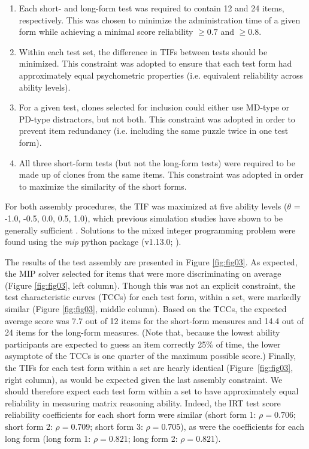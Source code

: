 \documentclass[a4paper,man,natbib,noextraspace]{apa6}
\begin{document}
\begin{enumerate}

    \item Each short- and long-form test was required to contain 12 and 24 items, respectively. This was chosen to minimize the administration time of a given form while achieving a minimal score reliability $\geq 0.7$ and $\geq 0.8$.
        
    \item Within each test set, the difference in TIFs between tests should be minimized. This constraint was adopted to ensure that each test form had approximately equal psychometric properties (i.e. equivalent reliability across ability levels). 
        
    \item For a given test, clones selected for inclusion could either use MD-type or PD-type distractors, but not both. This constraint was adopted in order to prevent item redundancy (i.e. including the same puzzle twice in one test form).
        
    \item All three short-form tests (but not the long-form tests) were required to be made up of clones from the same items. This constraint was adopted in order to maximize the similarity of the short forms.
    
\end{enumerate}

\noindent For both assembly procedures, the TIF was maximized at five ability levels ($\theta$ = -1.0, -0.5, 0.0, 0.5, 1.0), which previous simulation studies have shown to be generally sufficient \citep{der2005wj}. Solutions to the mixed integer programming problem were found using the \textit{mip} python package (v1.13.0; \citealt{santos2020mixed}).

The results of the test assembly are presented in Figure \ref{fig:fig03}. As expected, the MIP solver selected for items that were more discriminating on average (Figure \ref{fig:fig03}, left column). Though this was not an explicit constraint, the test characteristic curves (TCCs) for each test form, within a set, were markedly similar (Figure \ref{fig:fig03}, middle column). Based on the TCCs, the expected average score was 7.7 out of 12 items for the short-form measures and 14.4 out of 24 items for the long-form measures. (Note that, because the lowest ability participants are expected to guess an item correctly 25\% of time, the lower asymptote of the TCCs is one quarter of the maximum possible score.) Finally, the TIFs for each test form within a set are hearly identical (Figure~\ref{fig:fig03}, right column), as would be expected given the last assembly constraint. We should therefore expect each test form within a set to have approximately equal reliability in measuring matrix reasoning ability. Indeed, the IRT test score reliability coefficients \citep{kim2010estimation, nicewander2018conditional} for each short form were similar (short form 1: $\rho = 0.706$; short form 2: $\rho = 0.709$; short form 3: $\rho = 0.705$), as were the coefficients for each long form (long form 1: $\rho = 0.821$; long form 2: $\rho = 0.821$). 
\end{document}
